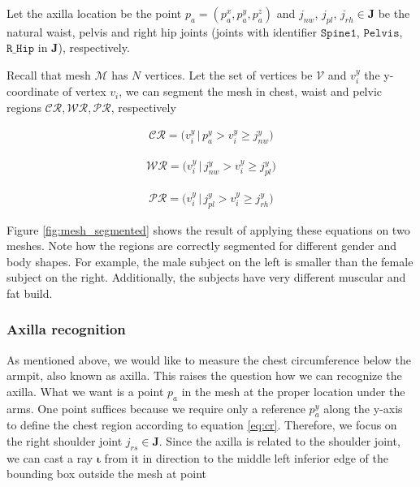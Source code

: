 \documentclass[runningheads, orivec]{llncs}
\begin{document}
Let the axilla location be the point $p_a = (p^x_a, p^y_a, p^z_a)$ and 
$j_{nw}$, $j_{pl}$, 
$j_{rh} \in \mathbf{J}$ be the natural waist, pelvis and right hip joints 
(joints with identifier $\mathtt{Spine1}$, $\mathtt{Pelvis}$, $\mathtt{R\_Hip}$ 
in 
$\mathbf{J}$), respectively.

Recall that mesh $\mathcal{M}$ has $N$ vertices. Let the set of vertices be 
$\mathcal{V}$ and $v^y_i$ the y-coordinate of vertex $v_i$, we can 
segment the 
mesh in chest, waist and pelvic regions 
$\mathcal{CR}, \mathcal{WR}, \mathcal{PR}$, respectively

\begin{align}\label{eq:cr}
\mathcal{CR} = \big(v^y_i \, | \, p^y_a > v^y_i \geq j^y_{nw} \big)
\end{align}

\begin{align}\label{eq:wr}
\mathcal{WR} = \big(v^y_i \, | \, j^y_{nw} > v^y_i \geq j^y_{pl}\big)
\end{align}

\begin{align}\label{eq:pr}
\mathcal{PR} = \big(v^y_i \, | \, j^y_{pl} > v^y_i \geq j^y_{rh}\big)
\end{align}

Figure \ref{fig:mesh_segmented} shows the result of applying these equations on 
two meshes. Note how the regions are correctly segmented for different gender 
and body shapes. For example, the male subject on the left is smaller than the 
female subject on the right. Additionally, the subjects have very different 
muscular and fat build.

\subsubsection{Axilla recognition}\label{subsec:armpit_recog}
As mentioned above, we would like to measure the chest circumference below the 
armpit, also known as axilla. This raises the question how we can recognize 
the axilla. What we want is a point $p_a$ in the mesh at the proper location 
under 
the arms. One point suffices because we require only a reference $p^y_a$ along 
the 
y-axis to define the chest region according to equation \ref{eq:cr}. Therefore, 
we focus on the right shoulder joint $j_{rs} \in \mathbf{J}$. Since the axilla 
is related to 
the shoulder joint, we can cast a ray $\boldsymbol{\iota}$ from it in direction 
to the middle left 
inferior edge of the bounding box outside the mesh at point
\end{document}
